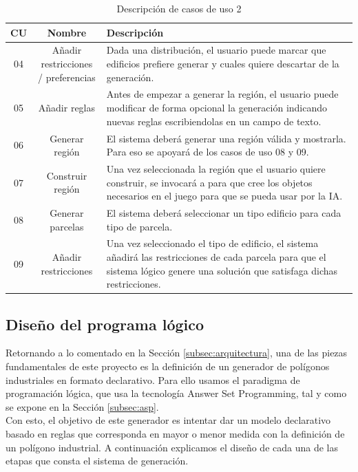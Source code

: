 \begin{table}[!h]
	\begin{tabularx}{\textwidth}{ c c X }
		\bfseries{CU} & \bfseries{Nombre} & \bfseries{Descripción} \\
		\hline
		04 & \makecell{Añadir restricciones \\ / preferencias} & Dada una distribución, el usuario puede marcar que edificios prefiere generar y cuales quiere descartar de la generación. \\
		\hline
		05 & Añadir reglas & Antes de empezar a generar la región, el usuario puede modificar de forma opcional la generación indicando nuevas reglas escribiendolas en un campo de texto. \\
		\hline
		06 & Generar región & El sistema deberá generar una región válida y mostrarla. Para eso se apoyará de los casos de uso 08 y 09. \\
		\hline
		07 & Construir región & Una vez seleccionada la región que el usuario quiere construir, se invocará a \cities para que cree los objetos necesarios en el juego para que se pueda usar por la IA. \\
		\hline
		08 & Generar parcelas & El sistema deberá seleccionar un tipo edificio para cada tipo de parcela. \\
		\hline
		09 & Añadir restricciones & Una vez seleccionado el tipo de edificio, el sistema añadirá las restricciones de cada parcela para que el sistema lógico genere una solución que satisfaga dichas restricciones. \\
		\hline
	\end{tabularx}
	\caption{Descripción de casos de uso 2}
	\label{table:casos-uso2}
\end{table}

\subsection{Diseño del programa lógico}
\label{subsubsec:generator}

Retornando a lo comentado en la Sección \ref{subsec:arquitectura}, una de las piezas fundamentales de este proyecto es la definición de un generador de polígonos industriales en formato declarativo. Para ello usamos el paradigma de programación lógica, que usa la tecnología Answer Set Programming, tal y como se expone en la Sección \ref{subsec:asp}. \\

Con esto, el objetivo de este generador es intentar dar un modelo declarativo basado en reglas que corresponda en mayor o menor medida con la definición de un polígono industrial. A continuación explicamos el diseño de cada una de las etapas que consta el sistema de generación.

